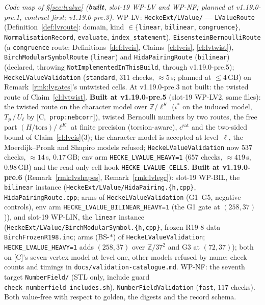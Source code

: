 \documentclass[11pt]{article}
\theoremstyle{remark}
\newcommand{\Z}{\mathbb{Z}}
\newcommand{\HA}[1]{[C,~\texttt{#1}]}      %
\begin{document}
\noindent\emph{Code map of \S\ref{sec:lvalue} (\textbf{built}, slot-19 WP-LV and WP-NF; planned at v1.19.0-pre.1, contract first; v1.19.0-pre.3).} WP-LV: \texttt{HeckeExt/LValue/} --- \texttt{LValueRoute} (Definition~\ref{def:lvroute}: domain, kind $\in\{$\texttt{linear}, \texttt{bilinear}, \texttt{congruence}$\}$,
\texttt{NormalisationRecord}, \texttt{evaluate}, \texttt{index\_statement}), \texttt{EisensteinBernoulliRoute} (a \texttt{congruence} route; Definitions~\ref{def:lveis}, Claims~\ref{cl:lveis},
\ref{cl:lvtwist}), \texttt{BirchModularSymbolRoute} (\texttt{linear}) and \texttt{HidaPairingRoute} (\texttt{bilinear}) (declared, throwing \texttt{NotImplementedInThisBuild}, through v1.19.0-pre.5);
\texttt{HeckeLValueValidation} (\texttt{standard}, $311$ checks, $\approx5$\,s; planned at $\le4$\,GB) on Remark~\ref{rmk:lvgates}'s untwisted cells. At v1.19.0-pre.3 not built: the twisted
route of Claim~\ref{cl:lvtwist}. \textbf{Built at v1.19.0-pre.5} (slot-19 WP-LV2, same files): the twisted route on the character model over $\Z/\ell^{K}$ ($\iota^{\ast}$ on the induced
model, $T_p$\,/\,$U_\ell$ by \HA{prop:nebcorr}), twisted Bernoulli numbers by two routes, the free part $(H/\mathrm{tors})/\ell^{K}$ at finite precision (torsion-aware), $c^{\mathrm{sat}}$ and the
two-sided bound of Claim~\ref{cl:lveis}(3); the character model is accepted at level~$\ell$, the Moerdijk--Pronk and Shapiro models refused; \texttt{HeckeLValueValidation} now
$537$ checks, $\approx14$\,s, $0.17$\,GB; env arm \texttt{HECKE\_LVALUE\_HEAVY=1} ($657$ checks, $\approx419$\,s, $0.98$\,GB) and the read-only cell hook
\texttt{HECKE\_LVALUE\_CELLS}. \textbf{Built at v1.19.0-pre.6} (Remark~\ref{rmk:lvshapes}, Remark~\ref{rmk:lvlegc}): slot-19 WP-BIL, the \texttt{bilinear} instance
(\texttt{HeckeExt/LValue/HidaPairing.\{h,cpp\}}, \texttt{HidaPairingRoute.cpp}; arms of \texttt{HeckeLValueValidation} (G1--G5, negative controls), env arm
\texttt{HECKE\_LVALUE\_BILINEAR\_HEAVY=1} (the G1 gate at $(258,37)$)), and slot-19 WP-LIN, the \texttt{linear} instance (\texttt{HeckeExt/LValue/BirchModularSymbol.\{h,cpp\}}, frozen
R19-8 data \texttt{BirchFrozenR198.inc}; arms (BS-$\ast$) of \texttt{HeckeLValueValidation}; \texttt{HECKE\_LVALUE\_HEAVY=1} adds $(258,37)$ over $\Z/37^{2}$ and G3 at $(72,37)$); both on
[C]'s seven-vertex model at level one, other models refused by name; check counts and timings in \texttt{docs/validation-catalogue.md}. WP-NF: the seventh target \texttt{NumberField/} (STL only, include guard
\texttt{check\_numberfield\_includes.sh}), \texttt{NumberFieldValidation} (\texttt{fast}, $117$ checks). Both value-free with respect to golden, the digests and the record schema.
\end{document}
